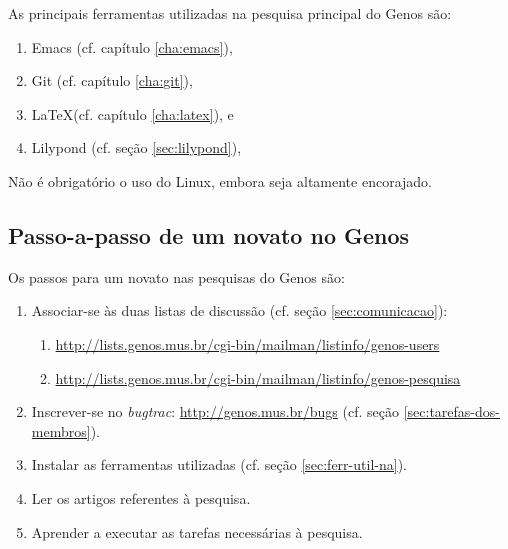 \documentclass[12pt,brazil]{book}
\begin{document}
As principais ferramentas utilizadas na pesquisa principal do Genos
são:

\begin{enumerate}
\item Emacs (cf. capítulo \ref{cha:emacs}),
\item Git (cf. capítulo \ref{cha:git}),
\item \LaTeX (cf. capítulo \ref{cha:latex}), e
\item Lilypond (cf. seção \ref{sec:lilypond}),
\end{enumerate}

Não é obrigatório o uso do Linux, embora seja altamente encorajado.

\subsection{Passo-a-passo de um novato no Genos}
\label{sec:passo-passo-de}

Os passos para um novato nas pesquisas do Genos são:

\begin{enumerate}
\item Associar-se às duas listas de discussão (cf. seção
  \ref{sec:comunicacao}):
  \begin{enumerate}
  \item \url{http://lists.genos.mus.br/cgi-bin/mailman/listinfo/genos-users}
  \item \url{http://lists.genos.mus.br/cgi-bin/mailman/listinfo/genos-pesquisa}
  \end{enumerate}
\item Inscrever-se no \textit{bugtrac}: \url{http://genos.mus.br/bugs}
  (cf. seção \ref{sec:tarefas-dos-membros}).
\item Instalar as ferramentas utilizadas (cf. seção
  \ref{sec:ferr-util-na}).
\item Ler os artigos referentes à pesquisa.
\item Aprender a executar as tarefas necessárias à pesquisa.
\end{enumerate}
\end{document}
